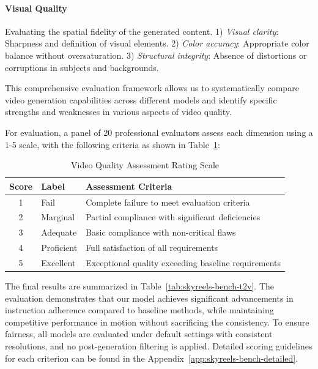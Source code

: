 \documentclass{article}
\begin{document}
{\paragraph{Visual Quality} Evaluating the spatial fidelity of the generated content.
1) \emph{Visual clarity}: Sharpness and definition of visual elements.
2) \emph{Color accuracy}: Appropriate color balance without oversaturation.
3) \emph{Structural integrity}: Absence of distortions or corruptions in subjects and backgrounds.

This comprehensive evaluation framework allows us to systematically compare video generation capabilities across different models and identify specific strengths and weaknesses in various aspects of video quality.

For evaluation, a panel of 20 professional evaluators assess each dimension using a 1-5 scale, with the following criteria as shown in Table~\ref{tab:rating_scale}:
\begin{table}[htbp]
\centering
\caption{Video Quality Assessment Rating Scale}
\label{tab:rating_scale}
\begin{tabular}{clp{10cm}}
\toprule
\textbf{Score} & \textbf{Label} & \textbf{Assessment Criteria} \\
\midrule
1 & Fail & Complete failure to meet evaluation criteria \\
2 & Marginal & Partial compliance with significant deficiencies \\
3 & Adequate & Basic compliance with non-critical flaws \\
4 & Proficient & Full satisfaction of all requirements \\
5 & Excellent & Exceptional quality exceeding baseline requirements \\
\bottomrule
\end{tabular}
\end{table}

The final results are summarized in Table~\ref{tab:skyreels-bench-t2v}. The evaluation demonstrates that our model achieves significant advancements in instruction adherence compared to baseline methods, while maintaining competitive performance in motion without sacrificing the consistency. To ensure fairness, all models are evaluated under default settings with consistent resolutions, and no post-generation filtering is applied. Detailed scoring guidelines for each criterion can be found in the Appendix~\ref{app:skyreels-bench-detailed}.

}
\end{document}
